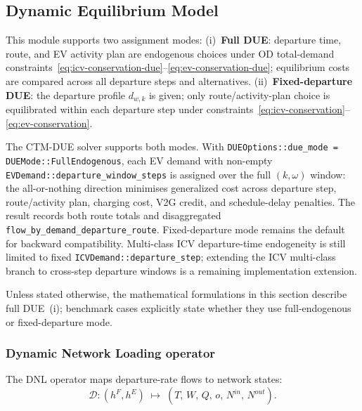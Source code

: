 \subsection{Dynamic Equilibrium Model}
\label{sec:traffic-equilibrium}

This module supports two assignment modes:
(i)~\textbf{Full DUE}: departure time, route, and EV activity plan are
endogenous choices under OD total-demand constraints~\eqref{eq:icv-conservation-due}--\eqref{eq:ev-conservation-due};
equilibrium costs are compared across all departure steps and alternatives.
(ii)~\textbf{Fixed-departure DUE}: the departure profile $d_{w,k}$ is
given; only route/activity-plan choice is equilibrated within each
departure step under constraints~\eqref{eq:icv-conservation}--\eqref{eq:ev-conservation}.

\begin{remark}
  The CTM-DUE solver supports both modes.  With
  \texttt{DUEOptions::due\_mode = DUEMode::FullEndogenous}, each EV demand
  with non-empty \texttt{EVDemand::departure\_window\_steps} is assigned over
  the full $(k,\omega)$ window: the all-or-nothing direction minimises
  generalized cost across departure step, route/activity plan, charging cost,
  V2G credit, and schedule-delay penalties.  The result records both route
  totals and disaggregated
  \texttt{flow\_by\_demand\_departure\_route}.  Fixed-departure mode remains
  the default for backward compatibility.  Multi-class ICV departure-time
  endogeneity is still limited to fixed \texttt{ICVDemand::departure\_step};
  extending the ICV multi-class branch to cross-step departure windows is a
  remaining implementation extension.
\end{remark}

Unless stated otherwise, the mathematical formulations in this section
describe full DUE~(i); benchmark cases explicitly state whether they use
full-endogenous or fixed-departure mode.

\subsubsection{Dynamic Network Loading operator}

The DNL operator maps departure-rate flows to network states:
\begin{equation}
  \mathcal{D} : (h^F, h^E)
  \;\mapsto\;
  (T,\, W,\, Q,\, o,\, N^{in},\, N^{out}).
  \label{eq:dnl-operator}
\end{equation}

